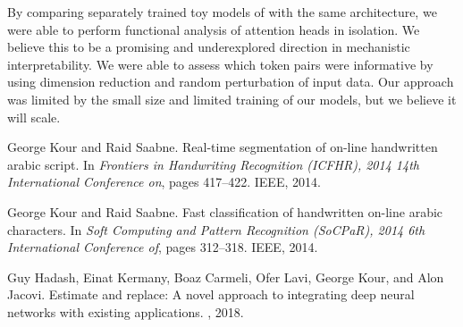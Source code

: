 \documentclass{article}
\begin{document}
By comparing separately trained toy models of with the same architecture, we were able to perform functional analysis of attention heads in isolation. We believe this to be a promising and underexplored direction in mechanistic interpretability. We were able to assess which token pairs were informative by using dimension reduction and random perturbation of input data. Our approach was limited by the small size and limited training of our models, but we believe it will scale.

  


\begin{thebibliography}{1}

George Kour and Raid Saabne.
\newblock Real-time segmentation of on-line handwritten arabic script.
\newblock In {\em Frontiers in Handwriting Recognition (ICFHR), 2014 14th
  International Conference on}, pages 417--422. IEEE, 2014.

George Kour and Raid Saabne.
\newblock Fast classification of handwritten on-line arabic characters.
\newblock In {\em Soft Computing and Pattern Recognition (SoCPaR), 2014 6th
  International Conference of}, pages 312--318. IEEE, 2014.

Guy Hadash, Einat Kermany, Boaz Carmeli, Ofer Lavi, George Kour, and Alon
  Jacovi.
\newblock Estimate and replace: A novel approach to integrating deep neural
  networks with existing applications.
, 2018.

\end{thebibliography}
\end{document}
